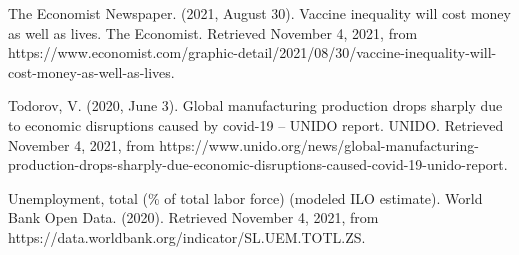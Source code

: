 \documentclass[fontsize=11pt]{article}
\begin{document}
    \item The Economist Newspaper. (2021, August 30). Vaccine inequality will cost money as well as lives. The Economist. \indent Retrieved November 4, 2021, from https://www.economist.com/graphic-detail/2021/08/30/vaccine-inequality-\indent will-cost-money-as-well-as-lives. \\

    \item Todorov, V. (2020, June 3). Global manufacturing production drops sharply due to economic disruptions caused \indent by covid-19 – UNIDO report. UNIDO. Retrieved November 4, 2021, from https://www.unido.org/news/global-\indent manufacturing-production-drops-sharply-due-economic-disruptions-caused-covid-19-unido-report. \\

    \item Unemployment, total (\% of total labor force) (modeled ILO estimate). World Bank Open Data. (2020). Retrieved \indent November 4, 2021, from https://data.worldbank.org/indicator/SL.UEM.TOTL.ZS. \\
\end{document}
